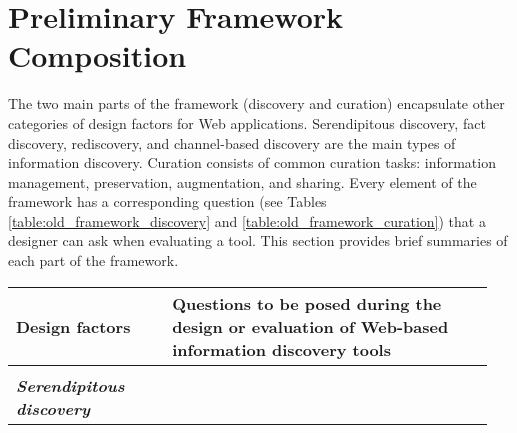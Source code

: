 {\section{Preliminary Framework Composition}
The two main parts of the framework (discovery and curation) encapsulate other categories of design factors for Web applications. Serendipitous discovery, fact discovery, rediscovery, and channel-based discovery are the main types of information discovery. Curation consists of common curation tasks: information management, preservation, augmentation, and sharing. Every element of the framework has a corresponding question (see Tables \ref{table:old_framework_discovery} and \ref{table:old_framework_curation}) that a designer can ask when evaluating a tool. This section provides brief summaries of each part of the framework.
\pagebreak

\begin{table*}[ht!]
\caption{Preliminary Framework - Discovery}
\centering
\label{table:old_framework_discovery}
\footnotesize
\begin{tabular}{|p{0.31\linewidth}|p{0.64\linewidth}|}
\hline
\textbf{\small{Design factors}}   & \textbf{\small{Questions to be posed during the design or evaluation of Web-based information discovery tools 
}}  \\
\hline
&\\
\emph{\textbf{Serendipitous discovery}}     &                                                                                                           \\


\end{tabular}
\end{table*}}
